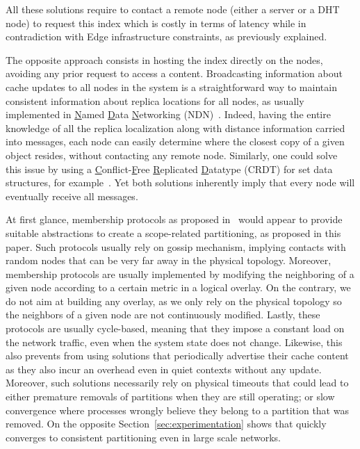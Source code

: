 All these solutions require to contact a remote node (either a server
or a DHT node) to request this index which is costly in terms of
latency while in contradiction with Edge infrastructure constraints,
as previously explained.

The opposite approach consists in hosting the index directly on the
nodes, avoiding any prior request to access a content.
Broadcasting information about cache updates to all nodes in the
system is a straightforward way to maintain consistent information
about replica locations for all nodes, as usually implemented in
\underline{N}amed \underline{D}ata \underline{N}etworking
(NDN)~\cite{nlsr}.  Indeed, having the entire knowledge of all the
replica localization along with distance information carried into
messages, each node can easily determine where the closest copy of a
given object resides, without contacting any remote node.  Similarly,
one could solve this issue by using a
\underline{C}onflict-\underline{F}ree \underline{R}eplicated
\underline{D}atatype (CRDT) for set data structures, for
example~\cite{shapiro2011crdts}. Yet both solutions inherently imply
that every node will eventually receive all messages.


At first glance, membership protocols as proposed in~\cite{t-man}
would appear to provide suitable abstractions to create a
scope-related partitioning, as proposed in this paper. Such protocols
usually rely on gossip mechanism, implying contacts with random nodes
that can be very far away in the physical topology. Moreover,
membership protocols are usually implemented by modifying the
neighboring of a given node according to a certain metric in a logical
overlay.  On the contrary, we do not aim at building any overlay, as
we only rely on the physical topology so the neighbors of a given node
are not continuously modified. Lastly, these protocols are usually
cycle-based, meaning that they impose a constant load on the network
traffic, even when the system state does not change. Likewise, this
also prevents from using solutions that periodically advertise their
cache content~\cite{garcia-lopez, hemmati2015namebased} as they also
incur an overhead even in quiet contexts without any update.
Moreover, such solutions necessarily rely on physical timeouts that
could lead to either premature removals of partitions when they are
still operating; or slow convergence where processes wrongly believe
they belong to a partition that was removed. On the opposite
Section~\ref{sec:experimentation} shows that \NAME quickly converges
to consistent partitioning even in large scale networks.


